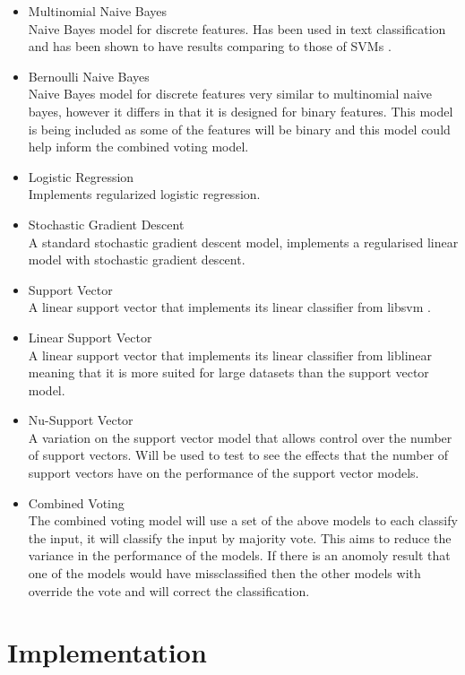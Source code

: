 \documentclass[11pt,oneside]{book}
\begin{document}
\begin{itemize}
\item Multinomial Naive Bayes \\
Naive Bayes model for discrete features. Has been used in text classification and has been shown to have results comparing to those of SVMs \citep{MNB}.
\item Bernoulli Naive Bayes \\
Naive Bayes model for discrete features very similar to multinomial naive bayes, however it differs in that it is designed for binary features. This model is being included as some of the features will be binary and this model could help inform the combined voting model. 
\item Logistic Regression \\
Implements regularized logistic regression.
\item Stochastic Gradient Descent \\
A standard stochastic gradient descent model, implements a regularised linear model with stochastic gradient descent.
\item Support Vector \\
A linear support vector that implements its linear classifier from libsvm \citep{libsvm}.
\item Linear Support Vector \\
A linear support vector that implements its linear classifier from liblinear \citep{liblinear} meaning that it is more suited for large datasets than the support vector model.
\item Nu-Support Vector \\
A variation on the support vector model that allows control over the number of support vectors. Will be used to test to see the effects that the number of support vectors have on the performance of the support vector models.
\item Combined Voting \\
The combined voting model will use a set of the above models to each classify the input, it will classify the input by majority vote. This aims to reduce the variance in the performance of the models. If there is an anomoly result that one of the models would have missclassified then the other models with override the vote and will correct the classification.
\end{itemize}

\section{Implementation}
\end{document}
